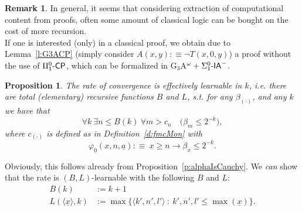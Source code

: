 \documentclass[1p]{elsarticle}
\newcommand{\usftext}[1]{\textsf{\upshape #1}}
\newcommand{\todo}[1]{{\it #1}
  \marginpar{\center\texttt{ToDo}}}    %
\newcommand{\IA}{\ensuremath{\usftext{IA}}} %
\newcommand{\CP}{\ensuremath{\usftext{CP}}}
\newcommand{\PiLm}{\ensuremath{\Pi^0_1\usftext{-}}}
\newcommand{\SiLm}{\ensuremath{\Sigma^0_1\usftext{-}}}
\newcommand{\tup}{\underline} %
\theoremstyle{plain}
\newtheorem{prop}[thm]{Proposition}
\theoremstyle{definition}
\newtheorem{rmk}[thm]{Remark}
\theoremstyle{remark}
\renewenvironment{proof}[1][]{\noindent{\bf Proof{#1}. }}{\nopagebreak[4]{\hspace*{\fill}
  $\Box$              %
 }{\vspace{2ex}}}
\renewcommand{\phi}{\varphi}
\theoremstyle{definition}
\begin{document}
{\begin{rmk}
In general, it seems that considering extraction of computational content from proofs, often some amount of classical logic can be bought on the cost of more recursion.\\
If one is interested (only) in a classical proof, we obtain due to Lemma~\ref{l:G3ACP}
(simply consider $A(x,y):\equiv \neg T(x,0,y)$) a proof without the use of $\PiLm\CP$, which can be formalized in G$_3$A$^{\omega}+\SiLm\IA^-$.
\end{rmk}


\begin{prop}\label{p:alphaIsLearnable}
The rate of convergence is effectively learnable in $k$, i.e.
there are total (elementary) 
recursive functions $B$ and $L$, s.t. for any $\beta_{(\cdot)}$, and any $k$ we have that
\[ \forall k\ \exists n\leq B(k)\ \forall m > c_n\quad \big(\beta_m\leq 2^{-k}\big),\]
where $c_{(\cdot)}$ is defined as in Definition~\ref{d:fmcMon} with
\[
\phi_0(x,n,\tup a):\equiv\ x\geq n\rightarrow \beta_x\leq 2^{-k}.
\]
\end{prop}
\begin{proof}
Obviously, this follows already from Proposition~\ref{p:alphaIsCauchy}. We \todo{can} show that the rate is $(B,L)$-learnable with the following $B$ and $L$:
\begin{align*}
B(k)&:=k+1  \\
L(\langle \tup x \rangle,k)&:= \max\{ \langle k',n',l' \rangle\ :\ k',n',l'\leq \max(\tup x) \}.
\end{align*}
\end{proof}


}
\end{document}
